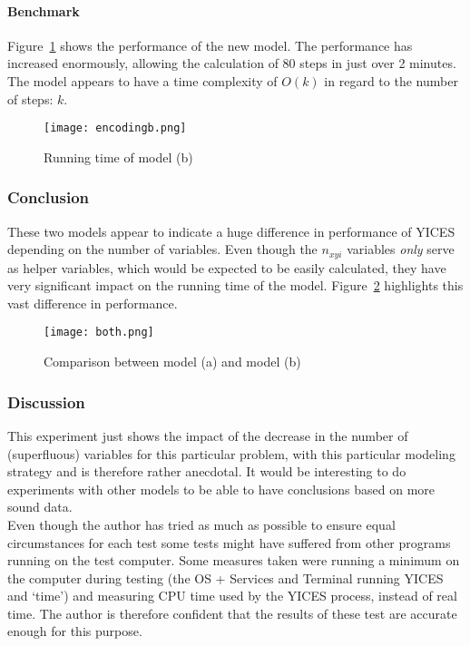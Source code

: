 \documentclass[12pt]{article}
\begin{document}
\paragraph{Benchmark} Figure~\ref{fig:modbrt} shows the performance of the new
model. The performance has increased enormously, allowing the calculation of 
80 steps in just over 2 minutes. The model appears to have a time complexity of
$O(k)$ in regard to the number of steps: $k$.

\begin{figure}
\texttt{[image: encodingb.png]}
\caption{Running time of model (b)}
\label{fig:modbrt}
\end{figure}

\subsubsection*{Conclusion}
These two models appear to indicate a huge difference in performance of YICES
depending on the number of variables. Even though the $n_{xyi}$ variables 
\emph{only} serve as helper variables, which would be expected to be easily 
calculated, they have very
significant impact on the running time of the model.
Figure~\ref{fig:comparison} highlights this vast difference in performance.

\begin{figure}
\texttt{[image: both.png]}
\caption{Comparison between model (a) and model (b)}
\label{fig:comparison}
\end{figure}

\subsubsection*{Discussion}

This experiment just shows the impact of the decrease in the number of 
(superfluous)
variables for this particular problem, with this particular modeling strategy 
and is therefore rather anecdotal. It would be interesting to do experiments 
with other models to be able to have conclusions based on more sound data.\\  

Even though the author has tried as much as possible to ensure equal 
circumstances for each test some tests might have suffered from other programs
running on the test computer. Some measures taken were running a 
minimum on the computer during testing (the OS + Services and Terminal running
YICES and `time') and measuring CPU time used by the YICES process, instead of
real time. The author is therefore confident that the results of these test are
accurate enough for this purpose.\\  
\end{document}
